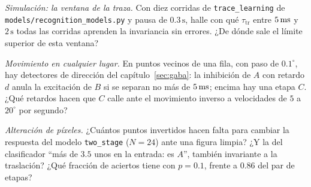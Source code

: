 \begin{exercise}[\lvlB]
\label{ex:12:6}
\emph{Simulación: la ventana de la traza.} Con diez corridas de \texttt{trace\_learning} de \texttt{models/\allowbreak recognition\_models.py} y pausa de $0.3\,\text{s}$, halle con qué $\tau_{\text{tr}}$ entre $5\,\text{ms}$ y $2\,\text{s}$ todas las corridas aprenden la invariancia sin errores. ¿De dónde sale el límite superior de esta ventana?
\end{exercise}

\begin{exercise}[\lvlB]
\label{ex:12:7}
\emph{Movimiento en cualquier lugar.} En puntos vecinos de una fila, con paso de $0.1^\circ$, hay detectores de dirección del capítulo~\ref{sec:gaba}: la inhibición de $A$ con retardo $d$ anula la excitación de $B$ si se separan no más de $5\,\text{ms}$; encima hay una etapa $C$. ¿Qué retardos hacen que $C$ calle ante el movimiento inverso a velocidades de $5$ a $20^\circ$ por segundo?
\end{exercise}

\begin{exercise}[\lvlC]
\label{ex:12:8}
\emph{Alteración de píxeles.} ¿Cuántos puntos invertidos hacen falta para cambiar la respuesta del modelo \texttt{two\_stage} ($N=24$) ante una figura limpia? ¿Y la del clasificador “más de $3.5$ unos en la entrada: es $A$”, también invariante a la traslación? ¿Qué fracción de aciertos tiene con $p=0.1$, frente a $0.86$ del par de etapas?
\end{exercise}
